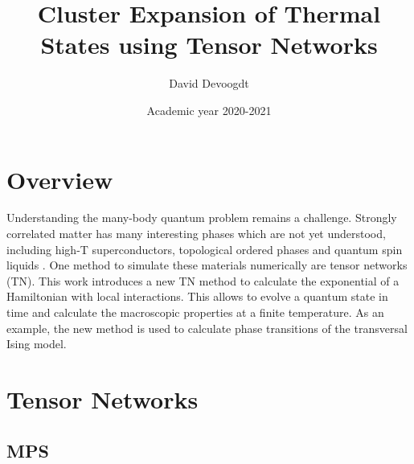 \documentclass[twocolumn]{article}
\title{Cluster Expansion of Thermal States using Tensor
Networks}
\author{David Devoogdt}
\date{Academic year 2020-2021}
\newcounter{a}
\newcounter{b}
\begin{document}



\maketitle

\begin{abstract}
    
\end{abstract}

\section{Overview}

Understanding the many-body quantum problem remains a challenge. Strongly correlated matter has many interesting phases which are not yet understood, including high-T superconductors, topological ordered phases and quantum spin liquids \cite{Orus2014}. One method to simulate these materials numerically are tensor networks (TN). This work introduces a new TN method to calculate the exponential of a Hamiltonian with local interactions. This allows to evolve a quantum state in time and calculate the macroscopic properties at a finite temperature. As an example, the new method is used to calculate phase transitions of the transversal Ising model.

\section{Tensor Networks}
\subsection{MPS}
\end{document}
